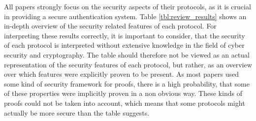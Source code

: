 All papers strongly focus on the security aspects of their protocols, as it is crucial in providing a
secure authentication system.
Table \ref{tbl:review_results} shows an in-depth overview of the security related features of each protocol.
For interpreting these results correctly, it is important to consider, that the security of each protocol
is interpreted without extensive knowledge in the field of cyber security and cryptography.
The table should therefore not be viewed as an actual representation of the security features of each protocol,
but rather, as an overview over which features were explicitly proven to be present.
As most papers used some kind of security framework for proofs, there is a high probability, that
some of these properties were implicitly proven in a non obvious way. These kinds of proofs could not
be taken into account, which means that some protocols might actually be more secure than the table suggests.

